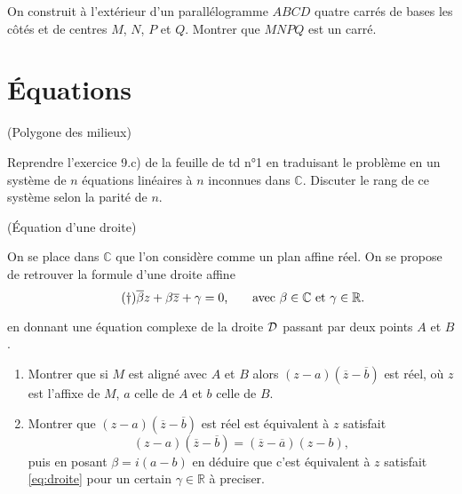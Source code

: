 \documentclass[a4paper,12pt,reqno]{amsart}
\begin{document}
\begin{exo}


  On construit à l'extérieur d'un parallélogramme $ABCD$ quatre carrés de bases les côtés et de centres $M$, $N$, $P$ et $Q$. Montrer que $MNPQ$ est un carré.
\end{exo}



\section{Équations}


\begin{exo} (Polygone des milieux)

  Reprendre l'exercice 9.c) de la feuille de td n°1 en traduisant le problème en un système de $n$ équations linéaires à $n$ inconnues dans $\mathbb{C}$. Discuter le rang de ce système selon la parité de $n$.
\end{exo}


\begin{exo} (Équation d'une droite)

  On se place dans $\mathbb{C}$ que l'on considère comme un plan affine réel. On se propose de retrouver la formule d'une droite affine
    \begin{equation}\tag{\dag}\label{eq:droite}
      \overline{\beta}z+\beta\overline{z}+\gamma=0
      \text{,\qquad avec } \beta \in \mathbb{C} \text{ et } \gamma \in \mathbb{R}.
    \end{equation}

  en donnant une équation complexe de la droite $\mathcal{D}$ passant par deux points $A$ et $B$.
  \begin{enumerate}
    \item Montrer que si $M$ est aligné avec $A$ et $B$ alors $(z-a)(\overline{z}-\overline{b})$ est réel, où $z$ est l'affixe de $M$, $a$ celle de $A$ et $b$ celle de $B$.
    \item Montrer que $(z-a)(\overline{z}-\overline{b})$ est réel est équivalent à $z$ satisfait
      $$
        (z-a)(\overline{z}-\overline{b})=(\overline{z}-\overline{a})(z-b),
      $$
      puis en posant $\beta=i(a-b)$ en déduire que c'est équivalent à $z$ satisfait \eqref{eq:droite} pour un certain $\gamma \in \mathbb{R}$ à preciser.
  \end{enumerate}
\end{exo}
\end{document}
